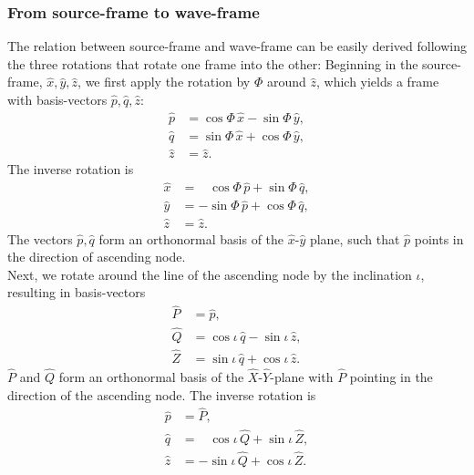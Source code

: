 \documentclass[11pt,tightenlines,article,amssymb,amsmath,amsfonts,superscriptaddress,nofootinbib]{revtex4}
\newcommand{\ExS}{{{\hat x}}}
\newcommand{\EyS}{{{\hat y}}}
\newcommand{\EzS}{{{\hat z}}}
\newcommand{\ExW}{\hat X}
\newcommand{\EyW}{\hat Y}
\newcommand{\EzW}{\hat Z}
\newcommand{\phiRef}{\Phi} %
\begin{document}
\subsubsection{From source-frame to wave-frame}

The relation between source-frame and wave-frame can be easily derived
following the three rotations that rotate one frame into the other:
Beginning in the source-frame, $\ExS, \EyS, \EzS$, we first apply the rotation
by $\phiRef$ around $\EzS$, which yields a frame with basis-vectors $\hat p, \hat q, \EzS$:
\begin{subequations}
  \label{eq:phiRef-Rotation1}
\begin{align}
  \hat p &= \cos\phiRef\,\ExS - \sin\phiRef\,\EyS,\\
  \hat q &= \sin\phiRef\,\ExS+\cos\phiRef\,\EyS,\\
  \EzS & = \EzS.
\end{align}
\end{subequations}
The inverse rotation is
\begin{subequations}
  \label{eq:phiRef-Rotation2}
\begin{align}
  \ExS &= \;\;\;\cos\phiRef\,\hat p + \sin\phiRef\,\hat q,\\
  \EyS &= -\sin\phiRef\,\hat p+\cos\phiRef\,\hat q,\\
  \EzS & = \EzS.
\end{align}
\end{subequations}
The vectors $\hat p, \hat q$ form an orthonormal basis of the
$\ExS$-$\EyS$ plane, such that $\hat p$ points in the direction of
ascending node. \\
Next, we rotate around the line of the ascending node by the inclination $\iota$,
resulting in basis-vectors
\begin{subequations}
  \label{eq:iota-Rotation1}
\begin{align}
  \hat P&=\hat p,\\
  \hat Q&=\cos\iota\,\hat q - \sin\iota\,\EzS,\\
  \hat Z&=\sin\iota\,\hat q+\cos\iota\,\EzS.
\end{align}
\end{subequations}
 $\hat P$ and $\hat Q$ form an orthonormal basis of the $\ExW$-$\EyW$-plane 
 with $\hat P$ pointing in the direction of the ascending node.
The inverse rotation is
\begin{subequations}
  \label{eq:iota-Rotation2}
\begin{align}
  \hat p&=\hat P,\\
  \hat q&=\;\;\;\cos\iota\,\hat Q + \sin\iota\,\EzW,\\
  \EzS &=-\sin\iota\,\hat Q+\cos\iota\,\EzW.
\end{align}
\end{subequations}
\end{document}
